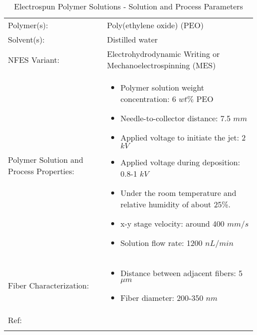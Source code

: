 \begin{table}[th]
\caption{Electrospun Polymer Solutions - Solution and Process Parameters}
\begin{center}
\begin{tabular}{
>{\raggedright\arraybackslash}p{}
>{\raggedright\arraybackslash}p{} }

\hline
Polymer(s): &
Poly(ethylene oxide) (PEO) \\

\arrayrulecolor{lightgray}\hline
Solvent(s): &
Distilled water \\

\hline
NFES Variant: &
Electrohydrodynamic Writing or Mechanoelectrospinning (MES) \\

\hline
Polymer Solution and Process Properties: &
\begin{itemize}[leftmargin=*]
\item Polymer solution weight concentration: 6 $w t \%$ PEO
\item Needle-to-collector distance: 7.5 $m m$
\item Applied voltage to initiate the jet: 2 $k V$
\item Applied voltage during deposition: 0.8-1 $k V$
\item Under the room temperature and relative humidity of about 25\%.
\item x-y stage velocity: around 400 $m m / s$
\item Solution flow rate: 1200 $n L / min$
\end{itemize} \\

\hline
Fiber Characterization: &
\begin{itemize}[leftmargin=*]
\item Distance between adjacent fibers: 5 $\mu m$
\item Fiber diameter: 200-350 $n m$
\end{itemize} \\

\hline
Ref: & \cite{Huang2015} \\ %
\arrayrulecolor{black}\hline
\label{tbl:FloresCompare}
\end{tabular}
\end{center}
\end{table}

